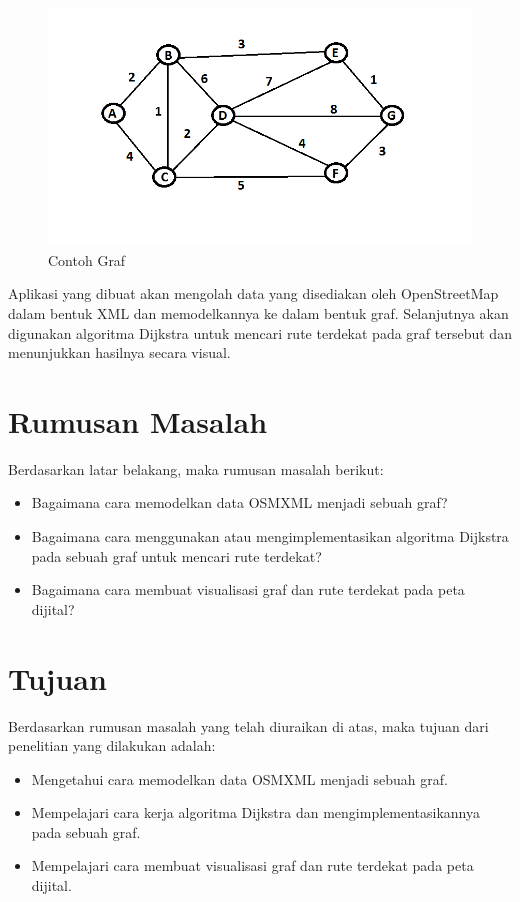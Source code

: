 \begin{figure}[h]
\centering
\includegraphics[scale=0.4]{Gambar/co_graf}
\caption[Contoh Graf]{Contoh Graf}
\label{fig:co_graf}
\end{figure}

Aplikasi yang dibuat akan mengolah data yang disediakan oleh OpenStreetMap dalam bentuk XML dan 
memodelkannya ke dalam bentuk graf. Selanjutnya akan digunakan algoritma Dijkstra untuk mencari 
rute terdekat pada graf tersebut dan menunjukkan hasilnya secara visual.

\section{Rumusan Masalah}
Berdasarkan latar belakang, maka rumusan masalah berikut: 
\begin{itemize}
	\item Bagaimana cara memodelkan data OSMXML menjadi sebuah graf?
	\item Bagaimana cara menggunakan atau mengimplementasikan algoritma Dijkstra
	pada sebuah graf untuk mencari rute terdekat?
	\item Bagaimana cara membuat visualisasi graf dan rute terdekat pada peta
	dijital?
\end{itemize}

\section{Tujuan}
Berdasarkan rumusan masalah yang telah diuraikan di atas, maka tujuan dari penelitian yang dilakukan
adalah:
\begin{itemize} 
	\item Mengetahui cara memodelkan data OSMXML menjadi sebuah	graf.
	\item Mempelajari cara kerja algoritma Dijkstra dan	mengimplementasikannya pada
	sebuah graf.
 	\item Mempelajari cara membuat visualisasi graf dan rute terdekat pada peta
 	dijital.
 \end{itemize}

